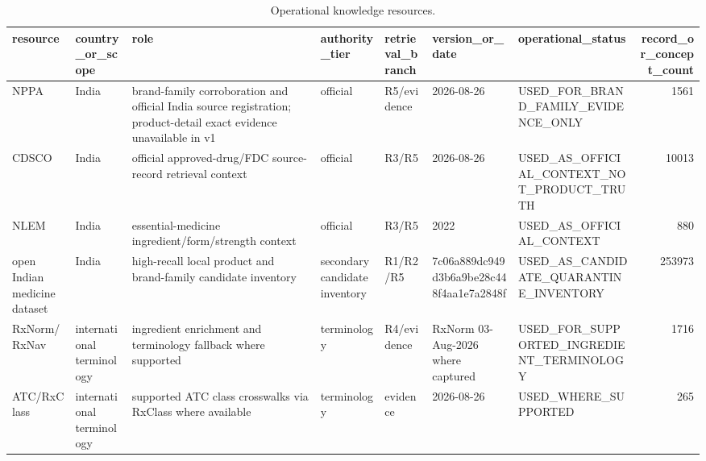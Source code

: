 \begin{table}
\caption{Operational knowledge resources.}
\begin{tabular}{lllllllr}
\toprule
resource & country\_or\_scope & role & authority\_tier & retrieval\_branch & version\_or\_date & operational\_status & record\_or\_concept\_count \\
\midrule
NPPA & India & brand-family corroboration and official India source registration; product-detail exact evidence unavailable in v1 & official & R5/evidence & 2026-08-26 & USED\_FOR\_BRAND\_FAMILY\_EVIDENCE\_ONLY & 1561 \\
CDSCO & India & official approved-drug/FDC source-record retrieval context & official & R3/R5 & 2026-08-26 & USED\_AS\_OFFICIAL\_CONTEXT\_NOT\_PRODUCT\_TRUTH & 10013 \\
NLEM & India & essential-medicine ingredient/form/strength context & official & R3/R5 & 2022 & USED\_AS\_OFFICIAL\_CONTEXT & 880 \\
open Indian medicine dataset & India & high-recall local product and brand-family candidate inventory & secondary candidate inventory & R1/R2/R5 & 7c06a889dc949d3b6a9be28c448f4aa1e7a2848f & USED\_AS\_CANDIDATE\_QUARANTINE\_INVENTORY & 253973 \\
RxNorm/RxNav & international terminology & ingredient enrichment and terminology fallback where supported & terminology & R4/evidence & RxNorm 03-Aug-2026 where captured & USED\_FOR\_SUPPORTED\_INGREDIENT\_TERMINOLOGY & 1716 \\
ATC/RxClass & international terminology & supported ATC class crosswalks via RxClass where available & terminology & evidence & 2026-08-26 & USED\_WHERE\_SUPPORTED & 265 \\
\bottomrule
\end{tabular}
\end{table}

